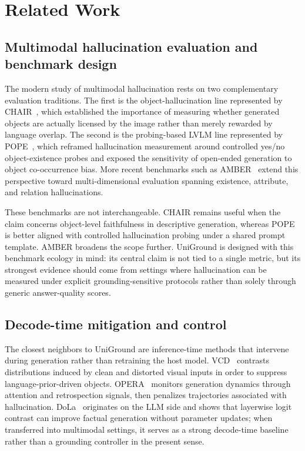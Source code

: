 \section{Related Work}
\label{sec:related}

\subsection{Multimodal hallucination evaluation and benchmark design}

The modern study of multimodal hallucination rests on two complementary evaluation traditions. The first is the object-hallucination line represented by CHAIR~\cite{rohrbach2018chair}, which established the importance of measuring whether generated objects are actually licensed by the image rather than merely rewarded by language overlap. The second is the probing-based LVLM line represented by POPE~\cite{li2023pope}, which reframed hallucination measurement around controlled yes/no object-existence probes and exposed the sensitivity of open-ended generation to object co-occurrence bias. More recent benchmarks such as AMBER~\cite{wang2023amber} extend this perspective toward multi-dimensional evaluation spanning existence, attribute, and relation hallucinations.

These benchmarks are not interchangeable. CHAIR remains useful when the claim concerns object-level faithfulness in descriptive generation, whereas POPE is better aligned with controlled hallucination probing under a shared prompt template. AMBER broadens the scope further. UniGround is designed with this benchmark ecology in mind: its central claim is not tied to a single metric, but its strongest evidence should come from settings where hallucination can be measured under explicit grounding-sensitive protocols rather than solely through generic answer-quality scores.

\subsection{Decode-time mitigation and control}

The closest neighbors to UniGround are inference-time methods that intervene during generation rather than retraining the host model. VCD~\cite{leng2024vcd} contrasts distributions induced by clean and distorted visual inputs in order to suppress language-prior-driven objects. OPERA~\cite{huang2024opera} monitors generation dynamics through attention and retrospection signals, then penalizes trajectories associated with hallucination. DoLa~\cite{chuang2024dola} originates on the LLM side and shows that layerwise logit contrast can improve factual generation without parameter updates; when transferred into multimodal settings, it serves as a strong decode-time baseline rather than a grounding controller in the present sense.

